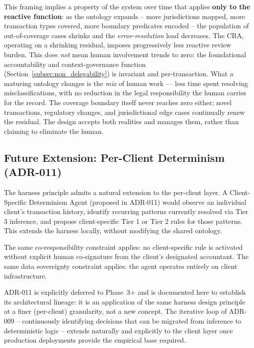 This framing implies a property of the system over time that applies
\textbf{only to the reactive function}: as the ontology expands -- more
jurisdictions mapped, more transaction types covered, more boundary predicates
encoded -- the population of out-of-coverage cases shrinks and the
\emph{error-resolution} load decreases. The CRA, operating on a shrinking
residual, imposes progressively less reactive review burden. This does
\emph{not} mean human involvement trends to zero: the foundational
accountability and context-governance function
(Section~\ref{subsec:non_delegability}) is invariant and per-transaction. What
a maturing ontology changes is the \emph{mix} of human work --- less time
spent resolving misclassifications, with no reduction in the legal
responsibility the human carries for the record. The coverage boundary itself
never reaches zero either; novel transactions, regulatory changes, and
jurisdictional edge cases continually renew the residual. The design accepts
both realities and manages them, rather than claiming to eliminate the human.

\subsection{Future Extension: Per-Client Determinism (ADR-011)}
\label{subsec:adr011_preview}

The harness principle admits a natural extension to the per-client layer.
A Client-Specific Determinism Agent (proposed in ADR-011) would observe an
individual client's transaction history, identify recurring patterns currently
resolved via Tier 3 inference, and propose client-specific Tier 1 or Tier 2
rules for those patterns. This extends the harness locally, without modifying
the shared ontology.

The same co-responsibility constraint applies: no client-specific rule is
activated without explicit human co-signature from the client's designated
accountant. The same data sovereignty constraint applies: the agent operates
entirely on client infrastructure.

ADR-011 is explicitly deferred to Phase~3+ and is documented here to
establish its architectural lineage: it is an application of the same harness
design principle at a finer (per-client) granularity, not a new concept.
The iterative loop of ADR-009 -- continuously identifying decisions that can
be migrated from inference to deterministic logic -- extends naturally and
explicitly to the client layer once production deployments provide the
empirical base required.

